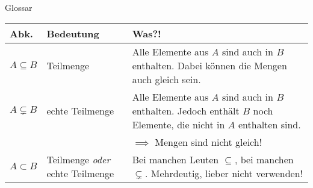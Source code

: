 \begin{frame}[fragile]{Glossar}
	\small
	\begin{tabular}{p{} p{} p{}}
		\toprule
		Abk.&Bedeutung&Was?!\\
		\midrule
		$A \subseteq B$ & Teilmenge & Alle Elemente aus $A$ sind auch in $B$ enthalten. Dabei können die Mengen auch gleich sein.\\
		$A \subsetneq B$ & echte Teilmenge & Alle Elemente aus $A$ sind auch in $B$ enthalten. Jedoch enthält $B$ noch Elemente, die nicht in $A$ enthalten sind.
		\\&&$\implies$ Mengen sind nicht gleich!\\
		$A \subset B$ & Teilmenge \emph{oder} echte Teilmenge & Bei manchen Leuten $\subseteq$, bei manchen $\subsetneq$. Mehrdeutig, lieber nicht verwenden!\\
		\bottomrule
	\end{tabular}
\end{frame}